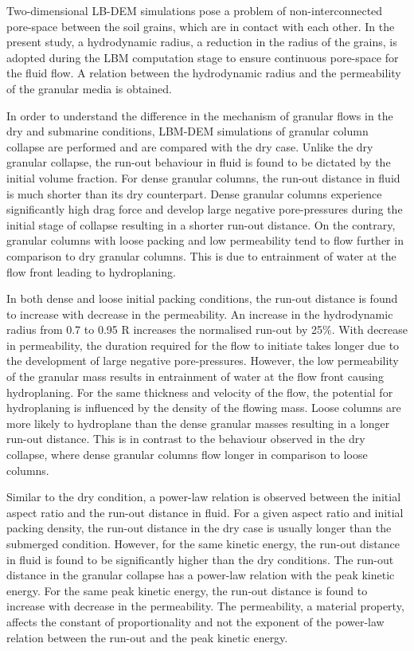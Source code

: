 Two-dimensional LB-DEM simulations pose a problem of non-interconnected 
pore-space between the soil grains, which are in contact with each other. In 
the present study, a hydrodynamic radius, a reduction in the radius of the 
grains, is adopted during the LBM computation stage to ensure continuous 
pore-space for the fluid flow. A relation between the hydrodynamic radius and 
the permeability of the granular media is obtained. 

In order to understand the difference in the mechanism of granular flows in the 
dry and submarine conditions, LBM-DEM simulations of granular column collapse 
are performed and are compared with the dry case. Unlike the dry granular 
collapse, the run-out behaviour in fluid is found to be dictated by the initial 
volume fraction. For dense granular columns, the run-out distance in fluid is 
much shorter than its dry counterpart. Dense granular columns experience 
significantly high drag force and develop large negative pore-pressures during 
the initial stage of collapse resulting in a shorter run-out distance. On the 
contrary, granular columns with loose packing and low permeability tend to flow 
further in comparison to dry granular columns. This is due to entrainment of 
water at the flow front leading to hydroplaning. 

In both dense and loose initial packing conditions, the run-out distance is 
found to increase with decrease in the permeability. An increase in the 
hydrodynamic radius from 0.7 to 0.95 R increases the
normalised run-out by 25\%. With decrease in permeability, the duration 
required for the flow to initiate takes longer due to the development of large 
negative pore-pressures. However, the low permeability of the granular mass 
results in entrainment of water at the flow front causing hydroplaning. For the 
same thickness and velocity of the flow, the potential for hydroplaning is 
influenced by the density of the flowing mass. Loose columns are more likely to 
hydroplane than the dense granular masses resulting in a longer run-out 
distance. This is in contrast to the behaviour observed in the dry collapse, 
where dense granular columns flow longer in comparison to loose columns.

Similar to the dry condition, a power-law relation is observed between the 
initial aspect ratio and the run-out distance in fluid. For a given 
aspect ratio and initial packing density, the run-out distance in the dry case 
is usually longer than the submerged condition. However, for the same kinetic 
energy, the run-out distance in fluid is found to be significantly higher than 
the dry conditions. The run-out distance in the granular collapse has a 
power-law relation with the peak kinetic energy. For the same peak kinetic 
energy, the run-out distance is found to increase with decrease in the 
permeability. The permeability, a material property, affects the constant of 
proportionality and not the exponent of the power-law relation between the 
run-out and the peak kinetic energy.

